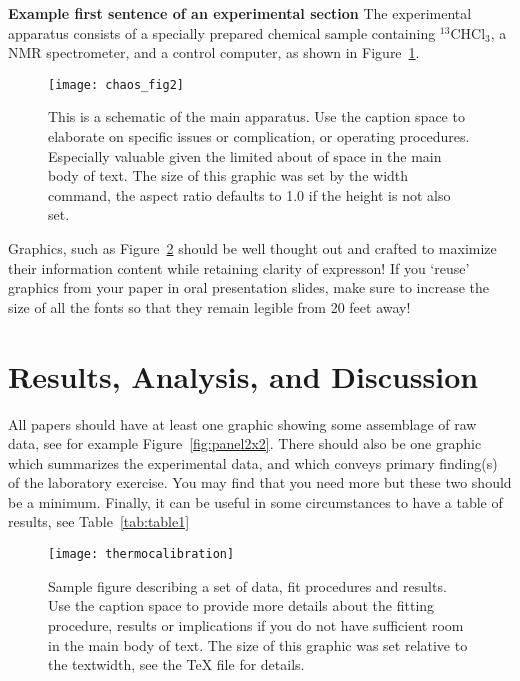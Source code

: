 \documentclass[aps,twocolumn,secnumarabic,nobalancelastpage,amsmath,amssymb,nofootinbib]{revtex4}
\begin{document}
{\bf Example first sentence of an experimental section}
The experimental apparatus consists of a specially prepared chemical
sample containing $^{13}$CHCl$_3$, a NMR spectrometer, and a control
computer, as shown in Figure~\ref{fig:samplefig}.

%
%
%

\begin{figure}
\texttt{[image: chaos\_fig2]}
\caption{This is a schematic of the main apparatus.  Use the caption
space to elaborate on specific issues or complication, or operating
procedures.  Especially valuable given the limited about of space in
the main body of text.  The size of this graphic was set by the width
command, the aspect ratio defaults to 1.0 if the height is not also
set. \label{fig:samplefig}}
\end{figure}

Graphics, such as Figure~\ref{fig:calibration} should be well thought
out and crafted to maximize their information content while retaining
clarity of expresson!  If you `reuse' graphics from your paper in oral
presentation slides, make sure to increase the size of all the fonts
so that they remain legible from 20 feet away!


\section{Results, Analysis, and Discussion}

All papers should have at least one graphic showing some assemblage of
raw data, see for example Figure~\ref{fig:panel2x2}. There should also
be one graphic which summarizes the experimental data, and which
conveys primary finding(s) of the laboratory exercise.  You may find
that you need more but these two should be a minimum.  Finally, it can
be useful in some circumstances to have a table of results, see
Table~\ref{tab:table1}


\begin{figure}[h]
\texttt{[image: thermocalibration]}
\caption{Sample figure describing a set of data, fit procedures and
results. Use the caption space to provide more details about the
fitting procedure, results or implications if you do not have
sufficient room in the main body of text.  The size of this graphic
was set relative to the textwidth, see the TeX file for details.}
\label{fig:calibration}
\end{figure}
\end{document}
